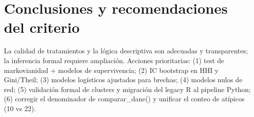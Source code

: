 \section{Conclusiones y recomendaciones del criterio}

La calidad de tratamientos y la lógica descriptiva son adecuadas y transparentes; la inferencia formal requiere ampliación. Acciones prioritarias: (1) test de markovianidad + modelos de supervivencia; (2) IC bootstrap en HHI y Gini/Theil; (3) modelos logísticos ajustados para brechas; (4) modelos nulos de red; (5) validación formal de clusters y migración del legacy R al pipeline Python; (6) corregir el denominador de comparar\_dane() y unificar el conteo de atípicos (10 vs 22).

